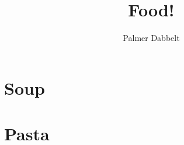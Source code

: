 \documentclass{book}
\author{Palmer Dabbelt}
\title{Food!}
\begin{document}
\maketitle
\tableofcontents
\contentsskip

\newcommand{\maketitle}{}
\renewcommand{\tableofcontents}{}
\newcommand{\author}[1]{}
\newcommand{\title}[1]{}
\renewcommand{\contentsskip}{}
\renewcommand{\bref}[1]{\ref{#1}}

\chapter{Soup}


\chapter{Pasta}
\end{document}
